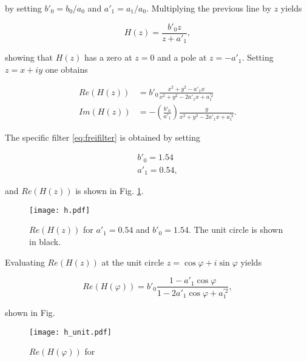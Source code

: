 \documentclass[12pt,a4paper]{article}
\begin{document}
by setting $b'_0=b_0/a_0$ and $a'_1=a_1/a_0$. Multiplying the previous line by $z$ yields

\begin{equation}\label{eq:iirf_trafofct_normal2}
H(z)=\frac{b'_0z}{z+a'_1},
\end{equation}

showing that $H(z)$ has a zero at $z=0$ and a pole at $z=-a'_1$. Setting $z=x+iy$ one obtains

\begin{align}
Re(H(z)) &= b'_0\frac{x^2+y^2-a'_1x}{x^2+y^2-2a'_1x+a_1^{'2}}\\
Im(H(z)) &= -\left(\frac{b'_0}{a'_1}\right)\frac{y}{x^2+y^2-2a'_1x+a_1^{'2}}.
\end{align}

The specific filter \eqref{eq:freifilter} is obtained by setting

\begin{align}
b'_0=1.54 \\
a'_1=0.54,
\end{align}

and $Re(H(z))$ is shown in Fig. \ref{fig:h}.

\begin{figure}[H]
	\centering
	\texttt{[image: h.pdf]}
	\caption{$Re(H(z))$ for $a'_1=0.54$ and $b'_0=1.54$. The unit circle is shown in black.}\label{fig:h}
\end{figure}

Evaluating $Re(H(z))$ at the unit circle $z=\cos{\varphi}+i \sin{\varphi}$ yields

\begin{equation}
Re(H(\varphi))=b'_0\frac{1-a'_1\cos{\varphi}}{1-2a'_1\cos{\varphi}+a_1^{'2}},
\end{equation}

shown in Fig.
\begin{figure}[H]
	\centering
	\texttt{[image: h\_unit.pdf]}
	\caption{$Re(H(\varphi))$ for }\label{fig:h_unit}
\end{figure}








\end{document}
